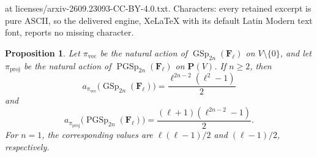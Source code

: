 \documentclass[10pt,a4paper]{amsart}
\newtheorem{proposition}[theorem]{Proposition}
\newcommand{\F}{\mathbf F}
\newcommand{\GSp}{\operatorname{GSp}}
\newcommand{\PGSp}{\operatorname{PGSp}}
\newcommand{\PP}{\mathbf P}
\begin{document}
at licenses/arxiv-2609.23093-CC-BY-4.0.txt. Characters: every retained excerpt is pure ASCII, so the delivered engine, XeLaTeX with its default Latin Modern text font, reports no missing character.
\begin{proposition}\label{prop:malle-invariants-natural}
Let $\pi_{\mathrm{vec}}$ be the natural action of
$\GSp_{2n}(\F_\ell)$ on $V\setminus\{0\}$, and let
$\pi_{\mathrm{proj}}$ be the natural action of
$\PGSp_{2n}(\F_\ell)$ on $\PP(V)$.  If $n\geq2$, then
\[
 a_{\pi_{\mathrm{vec}}}\bigl(\GSp_{2n}(\F_\ell)\bigr)
 =\frac{\ell^{2n-2}(\ell^2-1)}{2}
\]
and
\[
 a_{\pi_{\mathrm{proj}}}\bigl(\PGSp_{2n}(\F_\ell)\bigr)
 =\frac{(\ell+1)(\ell^{2n-2}-1)}{2}.
\]
For $n=1$, the corresponding values are
$\ell(\ell-1)/2$ and $(\ell-1)/2$, respectively.
\end{proposition}
\end{document}
